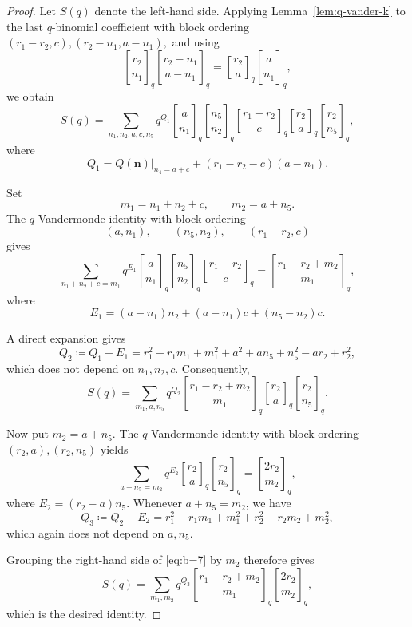 \documentclass[10pt,a4paper]{amsart}
\newcommand{\qbinom}[2]{\genfrac{[}{]}{0pt}{}{#1}{#2}_{\!q}} %
\begin{document}
\begin{proof}
Let $S(q)$ denote the left-hand side.
Applying Lemma~\ref{lem:q-vander-k} to the last $q$-binomial coefficient with block ordering
\(
    (r_1-r_2,c), (r_2-n_1,a-n_1),
\)
and using
\[
    \qbinom{r_2}{n_1}\qbinom{r_2-n_1}{a-n_1}
    =\qbinom{r_2}{a}\qbinom{a}{n_1},
\]
we obtain
\[
    S(q)=\sum_{n_1,n_2,a,c,n_5}q^{Q_1}
    \qbinom{a}{n_1}\qbinom{n_5}{n_2}
    \qbinom{r_1-r_2}{c}
    \qbinom{r_2}{a}\qbinom{r_2}{n_5},
\]
where
\[
    Q_1=
    \left.Q(\mathbf n)\right|_{n_4=a+c}
    +(r_1-r_2-c)(a-n_1).
\]

Set
\[
    m_1=n_1+n_2+c,\qquad m_2=a+n_5.
\]
The $q$-Vandermonde identity with block ordering
\[
    (a,n_1),\qquad(n_5,n_2),\qquad(r_1-r_2,c)
\]
gives
\[
    \sum_{n_1+n_2+c=m_1}q^{E_1}
    \qbinom{a}{n_1}\qbinom{n_5}{n_2}
    \qbinom{r_1-r_2}{c}
    =\qbinom{r_1-r_2+m_2}{m_1},
\]
where
\[
    E_1=(a-n_1)n_2+(a-n_1)c+(n_5-n_2)c.
\]

A direct expansion gives
\[
    Q_2\coloneqq Q_1-E_1=r_1^2-r_1 m_1+m_1^2
    +a^2+an_5+n_5^2-ar_2+r_2^2,
\]
which does not depend on $n_1,n_2,c$.
Consequently,
\begin{equation}\label{eq:b=7}
    S(q)=\sum_{m_1,a,n_5}
    q^{Q_2}
    \qbinom{r_1-r_2+m_2}{m_1}
    \qbinom{r_2}{a}\qbinom{r_2}{n_5}.
\end{equation}

Now put $m_2=a+n_5$. The $q$-Vandermonde identity with block ordering
$ (r_2,a),(r_2,n_5)$ yields
\[
    \sum_{a+n_5=m_2}q^{E_2}
    \qbinom{r_2}{a}\qbinom{r_2}{n_5}
    =\qbinom{2r_2}{m_2},
\]
where $E_2=(r_2-a)n_5$.  Whenever $a+n_5=m_2$, we have
\[
    Q_3\coloneqq Q_2-E_2
    =r_1^2-r_1 m_1+m_1^2+r_2^2-r_2 m_2+m_2^2,
\]
which again does not depend on $a,n_5$. 

Grouping the right-hand side of \eqref{eq:b=7} by $m_2$ therefore gives
\[
    S(q)=\sum_{m_1,m_2}
    q^{Q_3}
    \qbinom{r_1-r_2+m_2}{m_1}
    \qbinom{2r_2}{m_2},
\]
which is the desired identity.
\end{proof}
\end{document}
